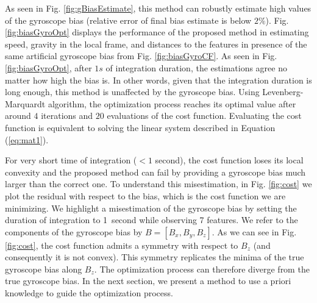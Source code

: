 \documentclass[letterpaper, 10pt, conference, final]{ieeeconf}  %
\begin{document}



As seen in Fig. \ref{fig:gBiasEstimate}, this method can robustly estimate high values of the gyroscope bias (relative error of final bias estimate is below $2\%$).
Fig. \ref{fig:biasGyroOpt} displays the performance of the proposed method in estimating speed, gravity in the local frame, and distances to the features in presence of the same artificial gyroscope bias from Fig. \ref{fig:biasGyroCF}.
As seen in Fig. \ref{fig:biasGyroOpt}, after $1s$ of integration duration, the estimations agree no matter how high the bias is.
In other words, given that the integration duration is long enough, this method is unaffected by the gyroscope bias.
Using Levenberg-Marquardt algorithm, the optimization process reaches its optimal value after around $4$ iterations and $20$ evaluations of the cost function.
Evaluating the cost function is equivalent to solving the linear system described in Equation (\ref{eq:mat1}).

\noindent For very short time of integration ($<1$ second), the cost function loses its local convexity and the proposed method can fail by providing a gyroscope bias much larger than the correct one.
To understand this misestimation, in Fig. \ref{fig:cost} we plot the residual with respect to the bias, which is the cost function we are minimizing.
We highlight a misestimation of the gyroscope bias by setting the duration of integration to 1~second while observing 7 features.
We refer to the components of the gyroscope bias by $B = [B_x, B_y, B_z]$.
As we can see in Fig. \ref{fig:cost}, the cost function admits a symmetry with respect to $B_z$ (and consequently it is not convex).
This symmetry replicates the minima of the true gyroscope bias along $B_z$.
The optimization process can therefore diverge from the true gyroscope bias.
In the next section, we present a method to use a priori knowledge to guide the optimization process.
\end{document}
